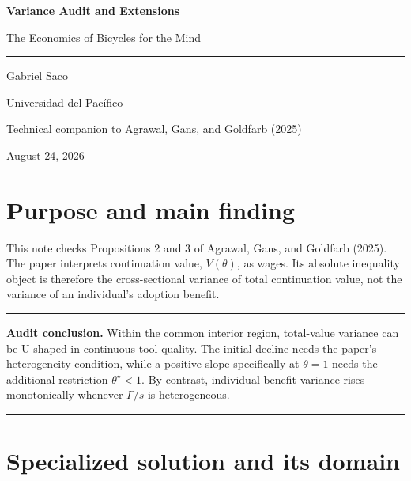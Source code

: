 \documentclass[11pt]{article}
\newenvironment{auditbox}
  {\begin{center}\begin{minipage}{0.94\textwidth}\color{navy}\hrule\vspace{0.55em}}
  {\vspace{0.45em}\hrule\end{minipage}\end{center}}
\begin{document}
\begin{titlepage}
  \vspace*{2.4cm}
  {\color{navy}\Huge\bfseries Variance Audit and Extensions\par}
  \vspace{0.45cm}
  {\Large\color{red} The Economics of Bicycles for the Mind\par}
  \vspace{0.65cm}
  {\color{red}\rule{\textwidth}{0.7pt}\par}
  \vspace{1.0cm}
  {\large Gabriel Saco\par}
  \vspace{0.15cm}
  {Universidad del Pac\'ifico\par}
  \vfill
  {\small Technical companion to Agrawal, Gans, and Goldfarb (2025)\par}
  \vspace{0.15cm}
  {\small August 24, 2026\par}
\end{titlepage}

\section*{Purpose and main finding}

This note checks Propositions 2 and 3 of Agrawal, Gans, and Goldfarb (2025).
The paper interprets continuation value, $V(\theta)$, as wages. Its absolute
inequality object is therefore the cross-sectional variance of total
continuation value, not the variance of an individual's adoption benefit.

\begin{auditbox}
\textbf{Audit conclusion.} Within the common interior region, total-value
variance can be U-shaped in continuous tool quality. The initial decline needs
the paper's heterogeneity condition, while a positive slope specifically at
$\theta=1$ needs the additional restriction $\theta^\star<1$. By contrast,
individual-benefit variance rises monotonically whenever $\Gamma/s$ is
heterogeneous.
\end{auditbox}

\section{Specialized solution and its domain}
\end{document}
